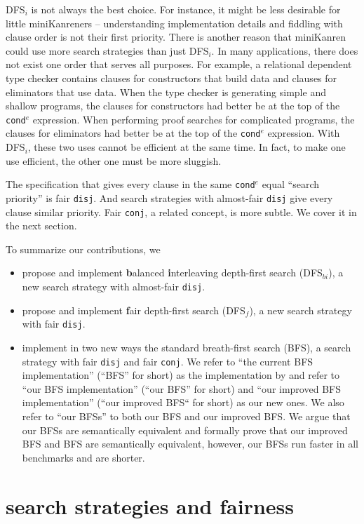 \documentclass[format=acmlarge, review=true, authordraft=true]{acmart}
\newcommand{\conde}{\texttt{cond$^e$}}
\newcommand{\conj}{\texttt{conj}}
\newcommand{\disj}{\texttt{disj}}
\newcommand{\DFSi }[0]{DFS$_{i}$}
\newcommand{\DFSf }[0]{DFS$_{f}$}
\newcommand{\DFSbi}[0]{DFS$_{bi}$}
\newcommand{\BFS}[0]{BFS}
\newcommand{\BFSser}[0]{BFS}
\newcommand{\BFSuni}[0]{our BFS}
\newcommand{\BFSimp}[0]{our improved BFS}
\begin{document}
\DFSi{} is not always the best choice. For instance, it might be less 
desirable for little miniKanreners -- understanding implementation details and 
fiddling with clause order is not their first priority. 
There is another reason that miniKanren could use more search strategies than
just \DFSi. In many applications, there does not exist one order that serves all
purposes. For example, a relational dependent type checker contains
clauses for constructors that build data and clauses for eliminators that use
data. When the type checker is generating simple and shallow programs,
the clauses for constructors had better be at the top of the
\conde{} expression.
When performing proof searches for complicated programs, the clauses for 
eliminators had better be at the top of the \conde{} expression. With \DFSi, 
these two uses cannot be efficient at the same time. In fact, to make one use 
efficient, the other one must be more sluggish.

The specification that gives every clause in the same \conde{} equal 
``search priority'' is fair \disj{}. And search strategies with 
almost-fair \disj{} give every clause similar priority. 
Fair \conj{}, a related concept, is more subtle. We cover it in the next 
section.

To summarize our contributions, we
\begin{itemize}
	\item propose and implement \textbf{b}alanced \textbf{i}nterleaving 
depth-first search (\DFSbi{}), a new search strategy with almost-fair \disj{}.
	\item propose and implement \textbf{f}air depth-first search (\DFSf{}), 
a new search strategy with fair \disj{}.
	\item implement in two new ways the standard breath-first search (\BFS), a 
search strategy with fair \disj{} and fair \conj{}. We refer to ``the current 
BFS implementation'' (``BFS'' for short) as the implementation by 
\citet{seres1999algebra} and refer to ``our BFS implementation'' (``our BFS'' 
for short) and ``our improved BFS implementation'' (``our improved BFS`` for 
short) as our new ones. We also refer to ``our \BFS{}s'' to both \BFSuni{} and 
\BFSimp{}. We argue that our \BFS{}s are semantically equivalent and formally 
prove that \BFSimp{} and \BFSser{} are semantically equivalent, however, our 
\BFS{}s run faster in all benchmarks and are shorter.
\end{itemize}

\section{search strategies and fairness}
\end{document}

